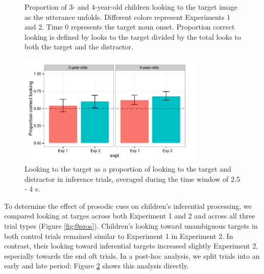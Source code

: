 \documentclass[10pt,letterpaper]{article}
\begin{document}
\begin{figure}[t]
	\caption{\label{fig:pros0} Proportion of 3- and 4-year-old children looking to the target image as the utterance unfolds. Different colors represent Experiments 1 and 2. Time 0 represents the target noun onset. Proportion correct looking is defined by looks to the target divided by the total looks to both the target and the distractor.}
\end{figure}

\begin{figure}[t]
\begin{center} 
\includegraphics[width=3.5in]{figures/simpimp0pros-bar_inf.pdf}
\caption{\label{fig:0prosbar} Looking to the target as a proportion of looking to the target and distractor in inference trials, averaged during the time window of 2.5 - 4 s.}
\end{center} 
\end{figure}

To determine the effect of prosodic cues on children's inferential processing, we compared looking at targes across both Experiment 1 and 2 and across all three trial types (Figure \ref{fig:0pros}). Children's looking toward unambiguous targets in both control trials remained similar to Experiment 1 in Experiment 2. In contrast, their looking toward inferential targets increased slightly Experiment 2, especially towards the end oft trials. In a post-hoc analysis, we split trials into an early and late period; Figure \ref{fig:0prosbar} shows this analysis directly. 
\end{document}
